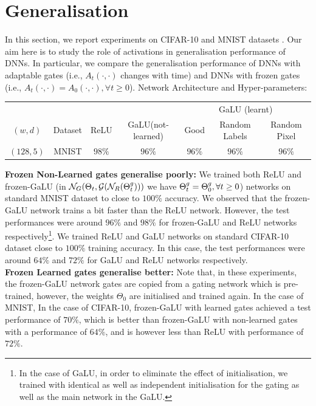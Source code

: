 \section{Generalisation}\label{sec:generalisation}
In this section, we report experiments on CIFAR-10 and MNIST  datasets . Our aim here is to study the role of activations in generalisation performance of DNNs. In particular, we compare the generalisation performance of DNNs with adaptable gates (i.e., $A_t(\cdot,\cdot)$ changes with time) and DNNs with frozen gates (i.e., $A_t(\cdot,\cdot)=A_0(\cdot,\cdot),\forall t\geq 0$).
Network Architecture and Hyper-parameters:\hfill\\
\begin{table}
\begin{tabular}{|c|c|c|c|c|c|c|}\hline
&&&&\multicolumn{3}{c|}{GaLU (learnt)}\\\cline{5-7}
$(w,d)$	&Dataset		&ReLU		&GaLU(not-learned) 		&Good 		&Random Labels 	&Random Pixel\\\hline
$(128,5)$	& MNIST 		& $98\%$ 		&$96\%$ 		&$96\%$		&$96\%$			&$96\%$\\\hline

\end{tabular}
\end{table}
\textbf{Frozen Non-Learned gates generalise poorly:} We trained both ReLU and frozen-GaLU (in $\mathcal{N}_G(\Theta_t,\mathcal{G}(\mathcal{N}_R({\Theta}^g_t)))$ we have ${\Theta}^g_t={\Theta}^g_0,\forall t\geq 0$) networks on standard MNIST dataset to close to $100\%$ accuracy. We observed that the frozen-GaLU network trains a bit faster than the ReLU network. However, the test performances were around $96\%$ and  $98\%$ for frozen-GaLU and ReLU networks respectively\footnote{In the case of GaLU, in order to eliminate the effect of initialisation, we trained with identical as well as independent initialisation for the gating as well as the main network in the GaLU. }. We trained ReLU and GaLU networks on standard CIFAR-10 dataset close to $100\%$ training accuracy. In this case, the test performances were around $64\%$ and $72\%$ for GaLU and ReLU networks respectively.\hfill\\
\textbf{Frozen Learned gates generalise better:} Note that, in these experiments, the frozen-GaLU network gates are copied from a gating network which is pre-trained, however, the weights $\Theta_0$ are initialised and trained again.  In the case of MNIST, 
In the case of CIFAR-10, frozen-GaLU with learned gates achieved a test performance of $70\%$, which is better than frozen-GaLU with non-learned gates with a performance of  $64\%$, and is however less than ReLU with performance of $72\%$. \hfill\\
